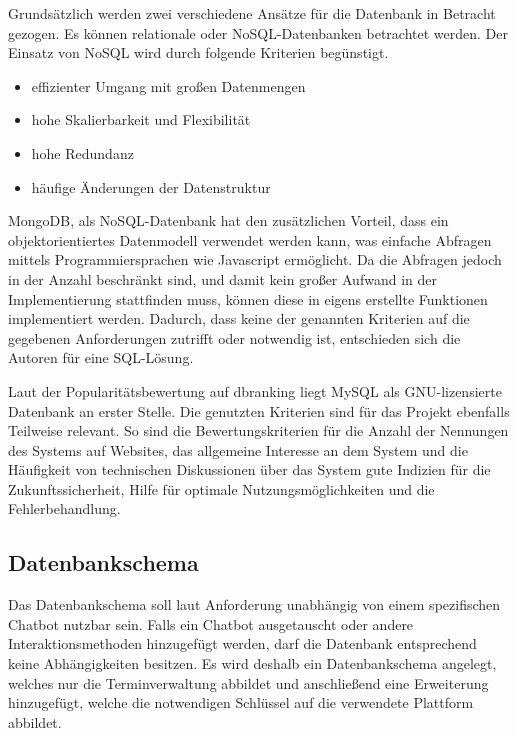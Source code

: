 Grundsätzlich werden zwei verschiedene Ansätze für die Datenbank in Betracht gezogen. Es können relationale oder NoSQL-Datenbanken betrachtet werden. Der Einsatz von NoSQL wird durch folgende Kriterien begünstigt.

\begin{itemize}
	\item effizienter Umgang mit großen Datenmengen
	\item hohe Skalierbarkeit und Flexibilität
	\item hohe Redundanz
	\item häufige Änderungen der Datenstruktur
\end{itemize}

MongoDB, als NoSQL-Datenbank hat den zusätzlichen Vorteil, dass ein objektorientiertes Datenmodell verwendet werden kann, was einfache Abfragen mittels Programmiersprachen wie Javascript ermöglicht. Da die Abfragen jedoch in der Anzahl beschränkt sind, und damit kein großer Aufwand in der Implementierung stattfinden muss, können diese in eigens erstellte Funktionen implementiert werden. Dadurch, dass keine der genannten Kriterien auf die gegebenen Anforderungen zutrifft oder notwendig ist, entschieden sich die Autoren für eine SQL-Lösung.

Laut der Popularitätsbewertung auf {dbranking} liegt MySQL als GNU-lizensierte Datenbank an erster Stelle. Die genutzten Kriterien sind für das Projekt ebenfalls Teilweise relevant. So sind die Bewertungskriterien für die Anzahl der Nennungen des Systems auf Websites, das allgemeine Interesse an dem System und die Häufigkeit von technischen Diskussionen über das System gute Indizien für die Zukunftssicherheit, Hilfe für optimale Nutzungsmöglichkeiten und die Fehlerbehandlung.



\subsection{Datenbankschema}

Das Datenbankschema soll laut Anforderung unabhängig von einem spezifischen Chatbot nutzbar sein. Falls ein Chatbot ausgetauscht oder andere Interaktionsmethoden hinzugefügt werden, darf die Datenbank entsprechend keine Abhängigkeiten besitzen. Es wird deshalb ein Datenbankschema angelegt, welches nur die Terminverwaltung abbildet und anschließend eine Erweiterung hinzugefügt, welche die notwendigen Schlüssel auf die verwendete Plattform abbildet.

